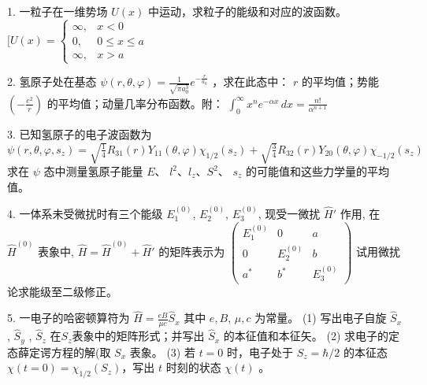 1. 一粒子在一维势场 $U(x)$ 中运动，求粒子的能级和对应的波函数。
$[ U(x) = \begin{cases} \infty, & x < 0 \\0, & 0 \le x \le a \\\infty, & x > a \end{cases}$

2. 氢原子处在基态 $\psi (r, \theta, \varphi) = \frac{1}{\sqrt{\pi a_0^3}} e^{-\frac{r}{a_0}}$ ，求在此态中： $r$ 的平均值；势能 $( -\frac{e^2}{r} )$ 的平均值；动量几率分布函数。附： 
$\int_0^\infty x^n e^{-\alpha x} \, dx = \frac{n!}{\alpha^{n+1}}$

3. 已知氢原子的电子波函数为 
$\psi(r, \theta, \varphi, s_z) = \sqrt{\frac{1}{4}} R_{31}(r) Y_{11}(\theta, \varphi) \chi_{1/2}(s_z) + \sqrt{\frac{3}{4}} R_{32}(r) Y_{20}(\theta, \varphi) \chi_{-1/2}(s_z)$
求在 $\psi$ 态中测量氢原子能量 $E$、 $l^2$、$l_z$、$ S^2 $、 $s_z$ 的可能值和这些力学量的平均值。

4. 一体系未受微扰时有三个能级 $E_1^{(0)}$, $E_2^{(0)}$, $E_3^{(0)}$, 现受一微扰 $\hat{H}'$ 作用, 在 $\hat{H}^{(0)}$ 表象中, 
$\hat{H} = \hat{H}^{(0)} + \hat{H}'$
的矩阵表示为
$\begin{pmatrix}E_1^{(0)} & 0 & a \\0 & E_2^{(0)} & b \\a^* & b^* & E_3^{(0)}\end{pmatrix}$
试用微扰论求能级至二级修正。

5. 一电子的哈密顿算符为
$\hat{H} = \frac{eB}{\mu c} \hat{S}_x$
其中 $e, B$, $\mu, c$ 为常量。
(1) 写出电子自旋 $\hat{S}_x $, $\hat{S}_y$ , $\hat{S}_z$  在$S_z$表象中的矩阵形式；并写出 $\hat{S}_x$ 的本征值和本征矢。
(2) 求电子的定态薛定谔方程的解(取 $S_x$ 表象。
(3) 若 $t = 0$ 时，电子处于 $S_z = \hbar/2$ 的本征态 $\chi(t=0) = \chi_{1/2}(S_z)$，写出 $t$ 时刻的状态 $\chi(t)$ 。

